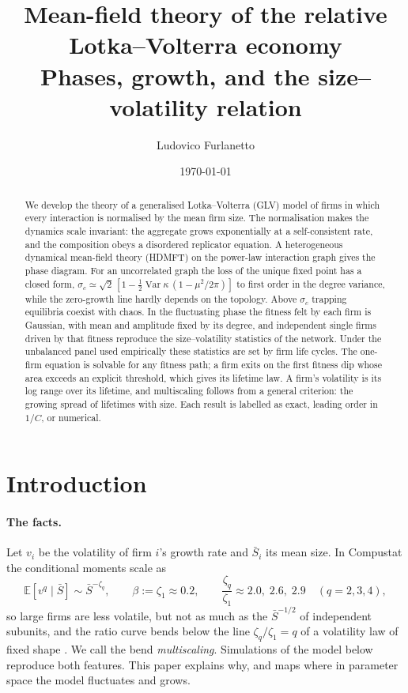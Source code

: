 \documentclass[11pt]{article}
\title{Mean-field theory of the relative Lotka--Volterra economy\\[2pt]
\large Phases, growth, and the size--volatility relation}
\author{Ludovico Furlanetto}
\date{\today}
\newcommand{\E}{\mathbb E}
\newcommand{\Var}{\operatorname{Var}}
\begin{document}
\maketitle

\begin{abstract}
\noindent
We develop the theory of a generalised Lotka--Volterra (GLV) model of firms in which every
interaction is normalised by the mean firm size.  The normalisation makes the dynamics scale
invariant: the aggregate grows exponentially at a self-consistent rate, and the composition obeys
a disordered replicator equation.  A heterogeneous dynamical mean-field theory (HDMFT) on the
power-law interaction graph gives the phase diagram.  For an uncorrelated graph the loss of the
unique fixed point has a closed form, $\sigma_c\simeq\sqrt2\,[1-\tfrac12\Var\kappa\,(1-\mu^2/2\pi)]$ to
first order in the degree variance, while the zero-growth line hardly depends on the topology.
Above $\sigma_c$ trapping equilibria coexist with chaos.  In the fluctuating phase the fitness
felt by each firm is Gaussian, with mean and amplitude fixed by its degree, and independent
single firms driven by that fitness reproduce the size--volatility statistics of the network.
Under the unbalanced panel used empirically these statistics are set by firm life cycles.  The
one-firm equation is solvable for any fitness path; a firm exits on the first fitness dip
whose area exceeds an explicit threshold, which gives its lifetime law.  A firm's volatility is
its log range over its lifetime, and multiscaling follows from a general criterion: the growing
spread of lifetimes with size.  Each result is labelled as exact, leading order in $1/C$, or
numerical.
\end{abstract}

\tableofcontents

\section{Introduction}
\label{sec:intro}

\paragraph{The facts.}
Let $v_i$ be the volatility of firm $i$'s growth rate and $\bar S_i$ its mean size.  In
Compustat the conditional moments scale as
\begin{equation}
  \E[v^q\mid\bar S]\sim\bar S^{-\zeta_q},\qquad \beta:=\zeta_1\approx0.2,\qquad
  \frac{\zeta_q}{\zeta_1}\approx2.0,\;2.6,\;2.9\quad(q=2,3,4),
  \label{eq:facts}
\end{equation}
so large firms are less volatile, but not as much as the $\bar S^{-1/2}$ of independent
subunits, and the ratio curve bends below the line $\zeta_q/\zeta_1=q$ of a volatility law of
fixed shape \citep{moran2024}.  We call the bend \emph{multiscaling}.  Simulations of the model
below reproduce both features.  This paper explains why, and maps where in parameter space
the model fluctuates and grows.
\end{document}
